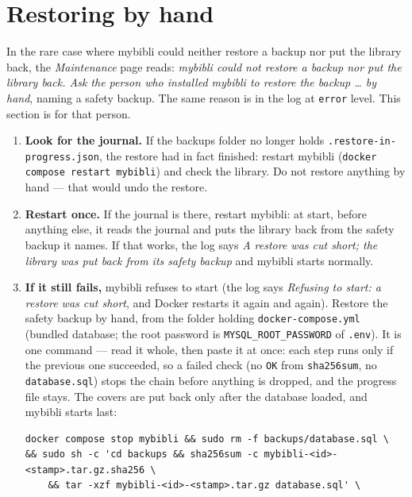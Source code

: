 \section{Restoring by hand}
\label{sec:restore-by-hand}

In the rare case where mybibli could neither restore a backup nor put
the library back, the \emph{Maintenance} page reads: \emph{mybibli
could not restore a backup nor put the library back. Ask the person who
installed mybibli to restore the backup \dots{} by hand}, naming a
safety backup. The same reason is in the log at \texttt{error} level.
This section is for that person.

\begin{enumerate}
  \item \textbf{Look for the journal.} If the backups folder no longer
        holds \texttt{.restore-\allowbreak in-\allowbreak progress.json}, the restore had in
        fact finished: restart mybibli
        (\texttt{docker compose restart mybibli}) and check the library.
        Do not restore anything by hand --- that would undo the
        restore.
  \item \textbf{Restart once.} If the journal is there, restart
        mybibli: at start, before anything else, it reads the journal
        and puts the library back from the safety backup it names. If
        that works, the log says \emph{A restore was cut short; the
        library was put back from its safety backup} and mybibli
        starts normally.
  \item \textbf{If it still fails,} mybibli refuses to start (the log
        says \emph{Refusing to start: a restore was cut short}, and
        Docker restarts it again and again). Restore the safety backup
        by hand, from the folder holding \texttt{docker-compose.yml}
        (bundled database; the root password is
        \texttt{MYSQL\_ROOT\_PASSWORD} of \texttt{.env}). It is one
        command --- read it whole, then paste it at once: each step runs
        only if the previous one succeeded, so a
        failed check (no \texttt{OK} from \texttt{sha256sum}, no
        \texttt{database.sql}) stops the chain before anything is
        dropped, and the progress file stays. The covers are put back
        only after the database loaded, and mybibli starts last:
\begin{lstlisting}
docker compose stop mybibli && sudo rm -f backups/database.sql \
&& sudo sh -c 'cd backups && sha256sum -c mybibli-<id>-<stamp>.tar.gz.sha256 \
    && tar -xzf mybibli-<id>-<stamp>.tar.gz database.sql' \

\end{lstlisting}
\end{enumerate}
